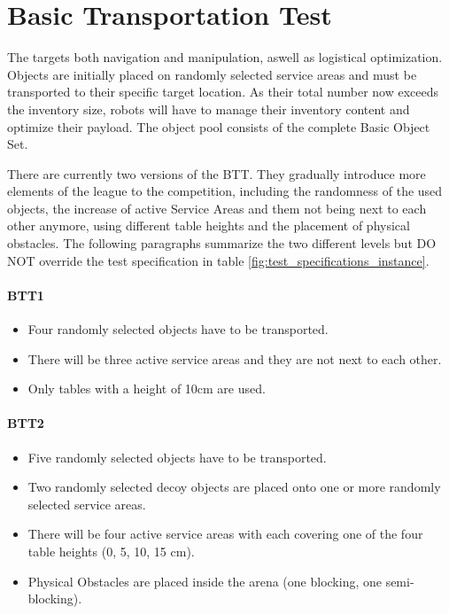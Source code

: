 
\section{Basic Transportation Test}
\label{sec:Basic Transportation Test}

The  targets both navigation and manipulation, aswell as logistical optimization. Objects are initially placed on randomly selected service areas and must be transported to their specific target location.
As their total number now exceeds the inventory size, robots will have to manage their inventory content and optimize their payload. The object pool consists of the complete Basic Object Set.

There are currently two versions of the BTT. 
They gradually introduce more elements of the league to the competition, including the randomness of the used objects, the increase of active Service Areas and them not being next to each other anymore, using different table heights and the placement of physical obstacles.
The following paragraphs summarize the two different levels but DO NOT override the test specification in table \ref{fig:test_specifications_instance}.

\paragraph{BTT1}
\begin{itemize}
\item Four randomly selected objects have to be transported.
\item There will be three active service areas and they are not next to each other.
\item Only tables with a height of 10cm are used. 
\end{itemize}

\paragraph{BTT2}
\begin{itemize}
\item Five randomly selected objects have to be transported.
\item Two randomly selected decoy objects are placed onto one or more randomly selected service areas.
\item There will be four active service areas with each covering one of the four table heights (0, 5, 10, 15 $\si{\centi\meter}$).
\item Physical Obstacles are placed inside the arena (one blocking, one semi-blocking).
\end{itemize}